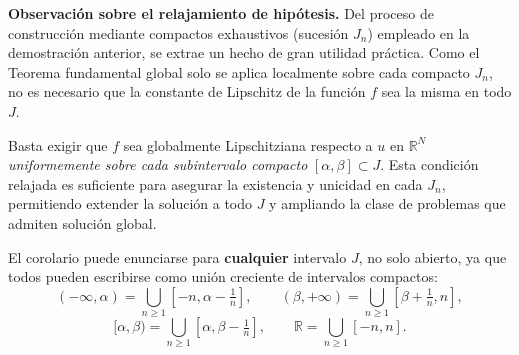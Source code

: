 \textbf{Observación sobre el relajamiento de hipótesis.} Del proceso de construcción mediante compactos exhaustivos (sucesión $J_n$) empleado en la demostración anterior, se extrae un hecho de gran utilidad práctica. Como el Teorema fundamental global solo se aplica localmente sobre cada compacto $J_n$, no es necesario que la constante de Lipschitz de la función $f$ sea la misma en todo $J$. 

Basta exigir que $f$ sea globalmente Lipschitziana respecto a $u$ en $\mathbb{R}^N$ \textit{uniformemente sobre cada subintervalo compacto} $[\alpha, \beta] \subset J$. Esta condición relajada es suficiente para asegurar la existencia y unicidad en cada $J_n$, permitiendo extender la solución a todo $J$ y ampliando la clase de problemas que admiten solución global.

\begin{observación}
    El corolario puede enunciarse para \textbf{cualquier} intervalo $J$, no solo abierto, ya que todos pueden escribirse como unión creciente de intervalos compactos:
    \[
        (-\infty, \alpha) = \bigcup_{n \geq 1} \left[ -n, \alpha - \tfrac{1}{n} \right], \qquad
        (\beta, +\infty) = \bigcup_{n \geq 1} \left[ \beta + \tfrac{1}{n}, n \right],
    \]
    \[
        [\alpha, \beta) = \bigcup_{n \geq 1} \left[ \alpha, \beta - \tfrac{1}{n} \right], \qquad
        \mathbb{R} = \bigcup_{n \geq 1} [-n, n].
    \]
\end{observación}


